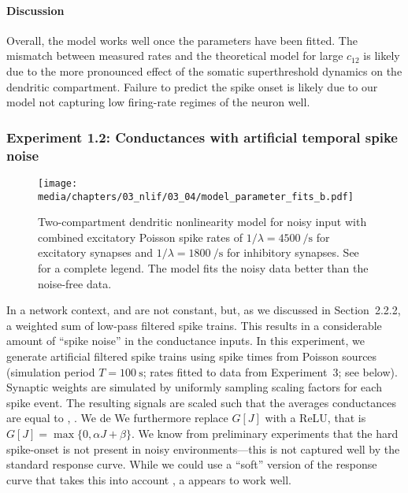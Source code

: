 \paragraph{Discussion}
Overall, the model works well once the parameters have been fitted.
The mismatch between measured rates and the theoretical model for large $c_{12}$ is likely due to the more pronounced effect of the somatic superthreshold dynamics on the dendritic compartment.
Failure to predict the spike onset is likely due to our model not capturing low firing-rate regimes of the neuron well.

\subsubsection{Experiment 1.2: Conductances with artificial temporal spike noise}

\begin{figure}[t]
	\texttt{[image: media/chapters/03\_nlif/03\_04/model\_parameter\_fits\_b.pdf]}%
	\caption[Two-compartment dendritic nonlinearity model for noisy input]{Two-compartment dendritic nonlinearity model for noisy input with combined excitatory Poisson spike rates of $1/\lambda = \SI{4500}{\per\second}$ for excitatory synapses and $1/\lambda = \SI{1800}{\per\second}$ for inhibitory synapses.
	See  for a complete legend.
	The model fits the noisy data better than the noise-free data.
	    }
	\label{fig:synaptic_nonlinearity_fit_b}%
\end{figure}

In a network context, \gE and \gI are not constant, but, as we discussed in Section~2.2.2, a weighted sum of low-pass filtered spike trains.
This results in a considerable amount of \enquote{spike noise} in the conductance inputs.
In this experiment, we generate artificial filtered spike trains using spike times from Poisson sources (simulation period $T = \SI{100}{\second}$; rates fitted to data from Experiment~3; see below).
Synaptic weights are simulated by uniformly sampling scaling factors for each spike event.
The resulting signals are scaled such that the averages conductances are equal to \gE, \gI.
We de
We furthermore replace $G[J]$ with a ReLU, that is $G[J] = \max\{ 0, \alpha J + \beta \}$.
We know from preliminary experiments that the hard \LIF spike-onset is not present in noisy environments---this is not captured well by the standard \LIF response curve.
While we could use a \enquote{soft} version of the \LIF response curve that takes this into account \citep[cf.][]{capocelli1971diffusion,hunsberger2014competing,kreutz2015mean}, a \ReLU appears to work well.

